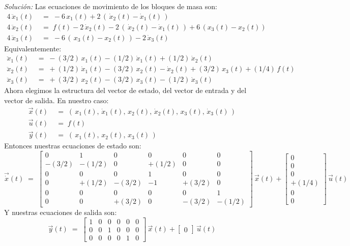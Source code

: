 \documentclass[ a4paper, twoside, 11pt]{article}
\begin{document}
\begin{problem}
\emph{Soluci\'on:} Las ecuaciones de movimiento de los bloques de masa son: 
\begin{align*}
4 \, \ddot{x}_1(t) \;
& = \; -6 \, x_1(t) + 2 \, ( \, \dot{x}_2(t) - \dot{x}_1(t) \, ) \\
4 \, \ddot{x}_2(t) \;
& = \; f(t) -2 \, \dot{x}_2(t) - 2 \, ( \, \dot{x}_2(t) - \dot{x}_1(t) \, ) + 6 \, ( x_3(t) - x_2(t) ) \\
4 \, \ddot{x}_3(t) \;
& = \; -6 \, ( \, x_3(t) - x_2(t) \, ) - 2 \, \dot{x}_3(t)
\end{align*}
Equivalentemente: 
\begin{align*}
\ddot{x}_1(t) \;
& = \; -(3/2) \, x_1(t) - (1/2) \, \dot{x}_1(t) + (1/2) \, \dot{x}_2(t) \\
\ddot{x}_2(t) \;
& = \; +(1/2) \, \dot{x}_1(t) - (3/2) \, x_2(t) - \dot{x}_2(t) + (3/2) \, x_3(t) + (1/4) \, f(t) \\
\ddot{x}_3(t) \;
& = \; +(3/2) \, x_2(t) - (3/2) \, x_3(t) - (1/2) \, \dot{x}_3(t)
\end{align*}
Ahora elegimos la estructura del vector de estado, del vector de entrada y del vector de salida. En nuestro caso: 
\begin{align*}
\vec{x}(t) \;
& = \; (\,
x_1(t), \, \dot{x}_1(t), \,
x_2(t), \, \dot{x}_2(t), \,
x_3(t), \, \dot{x}_3(t) \, ) \\
\vec{u}(t) \;
& = \; f(t) \\
\vec{y}(t) \;
& = \; (\, x_1(t), \, x_2(t), \, x_3(t) \, )
\end{align*}
Entonces nuestras ecuaciones de estado son: 
\[
\vec{\dot{x}}(t) \; = \; 
\left[ \begin{array}{cccccc}
0 & 1 & 0 & 0 & 0 & 0 \\
-(3/2) & -(1/2) & 0 & +(1/2) & 0 & 0 \\
0 & 0 & 0 & 1 & 0 & 0 \\
0 & +(1/2) & -(3/2) & -1 & +(3/2) & 0 \\
0 & 0 & 0 & 0 & 0 & 1 \\
0 & 0 & +(3/2) & 0 & -(3/2) & -(1/2)
\end{array} \right] \, \vec{x}(t) +
\left[ \begin{array}{c}
0 \\ 0 \\ 0 \\ +(1/4) \\ 0 \\ 0
\end{array} \right] \, \vec{u}(t)
\]
Y nuestras ecuaciones de salida son: 
\[
\vec{y}(t) \; = \;
\left[ \begin{array}{cccccc}
1 & 0 & 0 & 0 & 0 & 0 \\
0 & 0 & 1 & 0 & 0 & 0 \\
0 & 0 & 0 & 0 & 1 & 0
\end{array} \right] \, \vec{x}(t) +
\left[ \begin{array}{c}
0
\end{array} \right] \, \vec{u}(t)
\]

\end{problem}
\vspace{\baselineskip}
\end{document}
